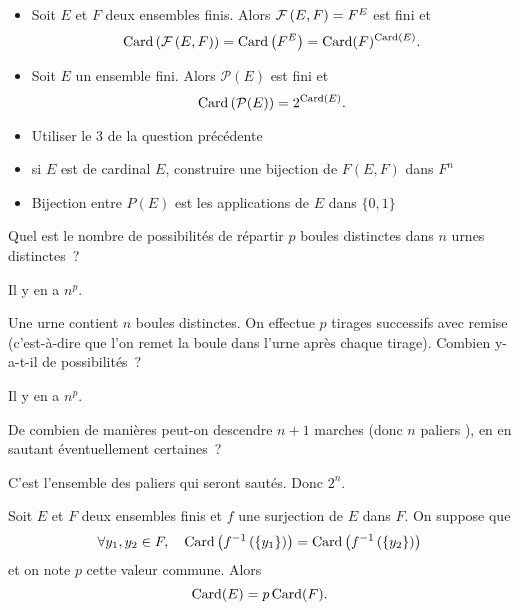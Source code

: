\documentclass{magnolia}
\begin{document}
\begin{proposition}
\begin{itemize}
\item Soit $E$ et $F$ deux ensembles finis. Alors $\mathcal{F}\left(E,F\right)=F^E$ est fini et
  \[\operatorname{Card}\left(\mathcal{F}\left(E,F\right)\right)=\operatorname{Card}\left(F^E\right)=\operatorname{Card}(F)^{\operatorname{Card}(E)}.\]
\item Soit $E$ un ensemble fini. Alors $\mathcal{P}(E)$ est fini et
  \[\operatorname{Card}\left(\mathcal{P}(E)\right)=2^{\operatorname{Card}(E)}.\]
\end{itemize}
\end{proposition}

\begin{preuve}
\begin{itemize}
\item Utiliser le 3 de la question précédente
\item si $E$ est de cardinal $E$, construire une bijection de $F(E,F)$ dans $F^n$
\item Bijection entre $P(E)$ est les applications de $E$ dans $\{0,1\}$
\end{itemize}
\end{preuve}

\begin{exoUnique}
\exo Quel est le nombre de possibilités de répartir $p$ boules distinctes
  dans $n$ urnes distinctes~?
  \begin{sol}
  Il y en a $n^p$.
  \end{sol}
\exo Une urne contient $n$ boules distinctes. On effectue $p$ tirages
  successifs avec remise (c'est-à-dire que l'on remet la boule dans l'urne
  après chaque tirage). Combien y-a-t-il de possibilités~?
  \begin{sol}
  Il y en a $n^p$.
  \end{sol}
\exo De combien de manières peut-on descendre $n+1$ marches (donc $n$
  \og paliers \fg), en en sautant éventuellement certaines~?
  \begin{sol}
  C'est l'ensemble des paliers qui seront sautés. Donc $2^n$.
  \end{sol}
\end{exoUnique}

\begin{proposition}[nom={Lemme des bergers}]
Soit $E$ et $F$ deux ensembles finis et $f$ une surjection de $E$ dans $F$. On
suppose que
\[\forall y_1,y_2\in F ,\quad \operatorname{Card}\left(f^{-1}\left(\left\{y_1\right\}\right)\right)=
  \operatorname{Card}\left(f^{-1}\left(\left\{y_2\right\}\right)\right)\]
et on note $p$ cette valeur commune. Alors
\[\operatorname{Card}(E)=p\operatorname{Card}(F).\]
\end{proposition}
\end{document}
